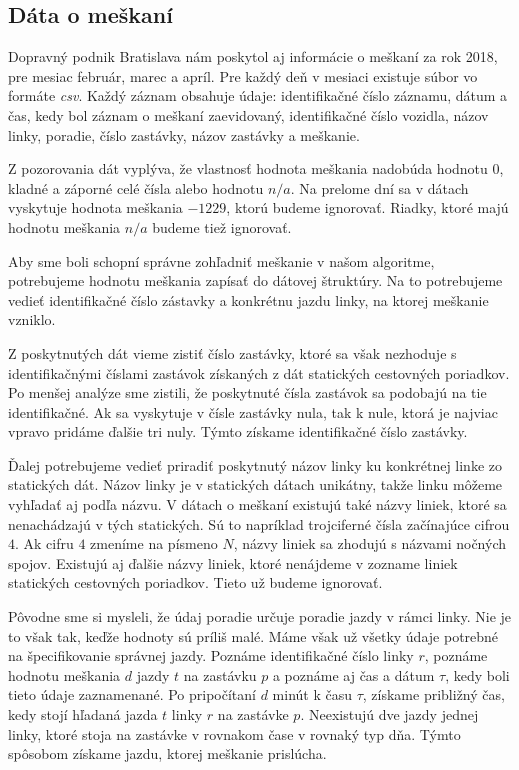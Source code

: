 \subsection{Dáta o meškaní}
\label{sec:delay-data}
Dopravný podnik Bratislava nám poskytol aj informácie o meškaní za rok 2018, pre mesiac február, marec a apríl. Pre každý deň v mesiaci existuje súbor vo formáte \textit{csv}. Každý záznam obsahuje údaje: identifikačné číslo záznamu, dátum a čas, kedy bol záznam o meškaní zaevidovaný, identifikačné číslo vozidla, názov linky, poradie, číslo zastávky, názov zastávky a meškanie.

Z pozorovania dát vyplýva, že vlastnosť hodnota meškania nadobúda hodnotu $0$, kladné a záporné celé čísla alebo hodnotu $n/a$. Na prelome dní sa v dátach vyskytuje hodnota meškania $-1229$, ktorú budeme ignorovať. Riadky, ktoré majú hodnotu meškania $n/a$ budeme tiež ignorovať.

Aby sme boli schopní správne zohľadniť meškanie v našom algoritme, potrebujeme hodnotu meškania zapísať do dátovej štruktúry. Na to potrebujeme vedieť identifikačné číslo zástavky a konkrétnu jazdu linky, na ktorej meškanie vzniklo. 

Z poskytnutých dát vieme zistiť číslo zastávky, ktoré sa však nezhoduje s identifikačnými číslami zastávok získaných z dát statických cestovných poriadkov. Po menšej analýze sme zistili, že poskytnuté čísla zastávok sa podobajú na tie identifikačné. Ak sa vyskytuje v čísle zastávky nula, tak k nule, ktorá je najviac vpravo pridáme ďalšie tri nuly. Týmto získame identifikačné číslo zastávky.

Ďalej potrebujeme vedieť priradiť poskytnutý názov linky ku konkrétnej linke zo statických dát. Názov linky je v statických dátach unikátny, takže linku môžeme vyhľadať aj podľa názvu. V dátach o meškaní existujú také názvy liniek, ktoré sa nenachádzajú v tých statických. Sú to napríklad trojciferné čísla začínajúce cifrou $4$. Ak cifru $4$ zmeníme na písmeno $N$, názvy liniek sa zhodujú s názvami nočných spojov. Existujú aj ďalšie názvy liniek, ktoré nenájdeme v zozname liniek statických cestovných poriadkov. Tieto už budeme ignorovať. 

Pôvodne sme si mysleli, že údaj poradie určuje poradie jazdy v rámci linky. Nie je to však tak, keďže hodnoty sú príliš malé. Máme však už všetky údaje potrebné na špecifikovanie správnej jazdy. Poznáme identifikačné číslo linky $r$, poznáme hodnotu meškania $d$ jazdy $t$ na zastávku $p$ a poznáme aj čas a dátum $\tau$, kedy boli tieto údaje zaznamenané. Po pripočítaní $d$ minút k času $\tau$, získame približný čas, kedy stojí hľadaná jazda $t$ linky $r$ na zastávke $p$. Neexistujú dve jazdy jednej linky, ktoré stoja na zastávke v rovnakom čase v rovnaký typ dňa. Týmto spôsobom získame jazdu, ktorej meškanie prislúcha.

